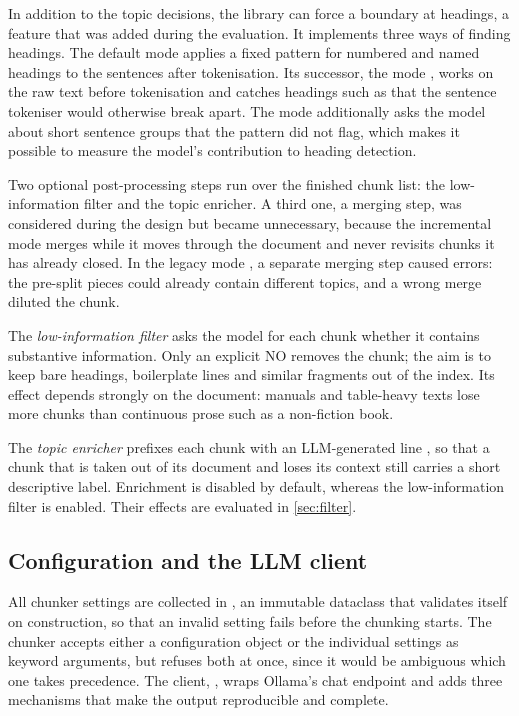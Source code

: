 In addition to the topic decisions, the library can force a boundary at headings, a
feature that was added during the evaluation. It implements three ways of finding
headings. The default mode  applies a fixed pattern for numbered and named
headings to the sentences after tokenisation. Its successor, the mode ,
works on the raw text before tokenisation and catches headings such as  that the sentence tokeniser would otherwise break apart. The mode
 additionally asks the model about short sentence groups that the pattern
did not flag, which makes it possible to measure the model's contribution to heading
detection.

Two optional post-processing steps run over the finished chunk list: the low-information
filter and the topic enricher. A third one, a merging step, was considered during the
design but became unnecessary, because the incremental mode merges while it moves through
the document and never revisits chunks it has already closed. In the legacy mode
, a separate merging step caused errors: the pre-split pieces could already
contain different topics, and a wrong merge diluted the chunk.

The \emph{low-information filter} asks the model for each chunk whether it contains
substantive information. Only an explicit NO removes the chunk; the aim is to keep bare
headings, boilerplate lines and similar fragments out of the index. Its effect depends
strongly on the document: manuals and table-heavy texts lose more chunks than continuous
prose such as a non-fiction book.

The \emph{topic enricher} prefixes each chunk with an LLM-generated line
, so that a chunk that is taken out of its document and loses its
context still carries a short descriptive label. Enrichment is disabled by default,
whereas the low-information filter is enabled. Their effects are evaluated in
\cref{sec:filter}.

\subsection{Configuration and the LLM client}
\label{sec:impl-client}

All chunker settings are collected in , an immutable dataclass that
validates itself on construction, so that an invalid setting fails before the chunking
starts. The chunker accepts either a configuration object or the individual settings as
keyword arguments, but refuses both at once, since it would be ambiguous which one takes
precedence. The client, , wraps Ollama's chat endpoint and adds three
mechanisms that make the output reproducible and complete.


